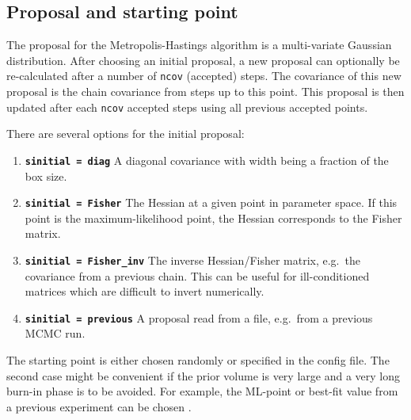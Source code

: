 \documentclass[11pt, chapterprefix, headsepline]{scrartcl}
\begin{document}
\begin{appendix}
\subsection{Proposal and starting point}
\label{sec:mcmc_proposal}

The proposal for the Metropolis-Hastings algorithm is a multi-variate
Gaussian distribution. After choosing an initial proposal, a new
proposal can optionally be re-calculated after a number of
\texttt{ncov} (accepted) steps. The covariance of this new proposal is
the chain covariance from steps up to this point. This proposal is
then updated after each \texttt{ncov} accepted steps using all
previous accepted points.

There are several options for the initial proposal:

\begin{enumerate}

\item \textbf{\texttt{sinitial = diag}} A diagonal
covariance with width being a fraction of the box size.

\item \textbf{\texttt{sinitial = Fisher}} The
Hessian at a given point in parameter space. If this point is the
maximum-likelihood point, the Hessian corresponds to the Fisher
matrix.

\item \textbf{\texttt{sinitial = Fisher\_inv}} The inverse
  Hessian/Fisher matrix, e.g.~the covariance from a previous
  chain. This can be useful for ill-conditioned matrices which are
  difficult to invert numerically.

\item \textbf{\texttt{sinitial = previous}} A proposal read from a
  file, e.g.\ from a previous MCMC run.

\end{enumerate}


The starting point is either chosen randomly or specified in the
config file. The second case might be convenient if the prior volume
is very large and a very long burn-in phase is to be avoided. For
example, the ML-point or best-fit value from a previous experiment can
be chosen \cite{WMAP5-Dunkley08}.


\end{appendix}
\end{document}
